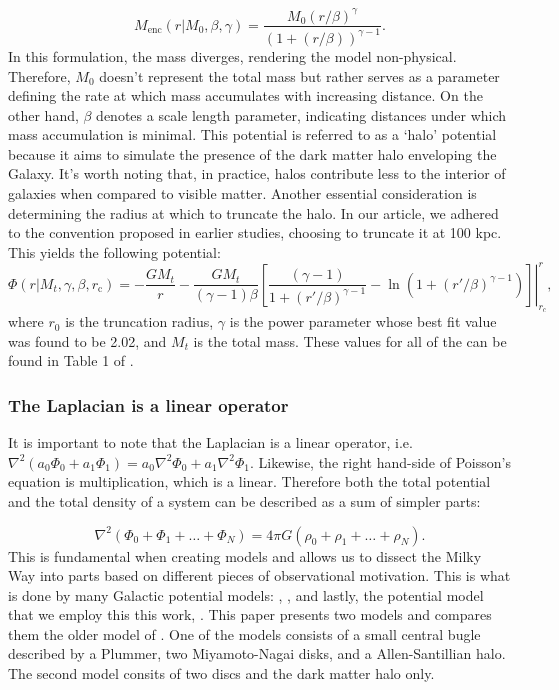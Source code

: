 \begin{equation}
    M_{\textrm{enc}}\left(r|M_0,\beta,\gamma\right) = \frac{M_{0}\left(r/\beta\right)^{\gamma}}{\left(1+\left(r/\beta\right)\right)^{\gamma-1}}.
\end{equation}
In this formulation, the mass diverges, rendering the model non-physical. Therefore, $M_0$ doesn't represent the total mass but rather serves as a parameter defining the rate at which mass accumulates with increasing distance. On the other hand, $\beta$ denotes a scale length parameter, indicating distances under which mass accumulation is minimal. This potential is referred to as a `halo' potential because it aims to simulate the presence of the dark matter halo enveloping the Galaxy. It's worth noting that, in practice, halos contribute less to the interior of galaxies when compared to visible matter. Another essential consideration is determining the radius at which to truncate the halo. In our article, we adhered to the convention proposed in earlier studies, choosing to truncate it at 100 kpc. This yields the following potential:
\begin{equation}
    \Phi\left(r|M_t,\gamma,\beta,r_\mathrm{c}\right) = -\frac{GM_t}{r} - \frac{GM_t}{\left(\gamma-1\right)\beta}\left.\left[\frac{\left(\gamma-1\right)}{1+\left(r'/\beta\right)^{\gamma-1}} - \ln\left(1+\left(r'/\beta\right)^{\gamma-1}\right)\right]\right|_{r_c}^{r},
\end{equation}
where $r_0$ is the truncation radius, $\gamma$ is the power parameter whose best fit value was found to be 2.02, and $M_t$ is the total mass. These values for all of the can be found in Table 1 of \citet{2023A&A...673A..44F}. 

\subsubsection*{The Laplacian is a linear operator}
It is important to note that the Laplacian is a linear operator, i.e. $\nabla^2\left(a_0\Phi_0 + a_1\Phi_1\right) = a_0\nabla^2\Phi_0 + a_1\nabla^2 \Phi_1$. Likewise, the right hand-side of Poisson's equation is multiplication, which is a linear. Therefore both the total potential and the total density of a system can be described as a sum of simpler parts:

\begin{equation}
    \nabla^2 \left(\Phi_0 + \Phi_1 + \dots + \Phi_N \right) = 4\pi G \left(\rho_0 + \rho_1 + \dots + \rho_N \right).
\end{equation}
This is fundamental when creating models and allows us to dissect the Milky Way into parts based on different pieces of observational motivation. This is what is done by many Galactic potential models: \citet{1991RMxAA..22..255A}, \citep{2017MNRAS.465...76M}, and lastly, the potential model that we employ this this work, \citet{2017A&A...598A..66P}. This paper presents two models and compares them the older model of \citet{1991RMxAA..22..255A}. One of the models consists of a small central bugle described by a Plummer, two Miyamoto-Nagai disks, and a Allen-Santillian halo. The second model consits of two discs and the dark matter halo only. 

